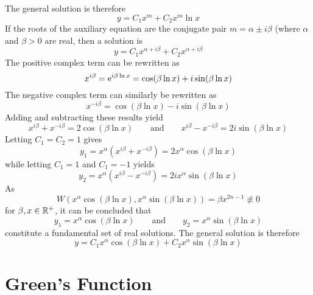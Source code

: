 \documentclass[./Differential Equations]{subfiles}
\begin{document}
				The general solution is therefore
				\[y = C_1x^m + C_2x^m\ln{x}\]
			If the roots of the auxiliary equation are the conjugate pair \(m = \alpha \pm i\beta\) (where \(\alpha\) and \(\beta > 0\) are real, then a solution is
				\[y = C_1x^{\alpha + i\beta} + C_2x^{\alpha + i\beta}\]
				The positive complex term can be rewritten as
				\[
					x^{i\beta} = \text{e}^{i\beta\ln{x}}
						= \cos(\beta\ln{x}) + i\sin(\beta\ln{x})
				\]
				The negative complex term can similarly be rewritten as
				\[x^{-i\beta} = \cos(\beta\ln{x}) - i\sin(\beta\ln{x})\]
				Adding and subtracting these results yield
				\[
					x^{i\beta} + x^{-i\beta} = 2\cos(\beta\ln{x}) \qquad \text{and} \qquad
					x^{i\beta} - x^{-i\beta} = 2i\sin(\beta\ln{x})
				\]
				Letting \(C_1 = C_2 = 1\) gives
				\[
					y_1 = x^\alpha\left(x^{i\beta} + x^{-i\beta}\right)
						= 2x^\alpha\cos(\beta\ln{x})
				\]
				while letting \(C_1 = 1\) and \(C_1 = -1\) yields 
				\[
					y_2 = x^\alpha\left(x^{i\beta} - x^{-i\beta}\right)
						= 2ix^\alpha\sin(\beta\ln{x})
				\]
				As 
				\[W\left(x^\alpha\cos(\beta\ln{x}), x^\alpha\sin(\beta\ln{x})\right) = \beta x^{2n - 1} \not\equiv 0\]
				for \(\beta, x \in \mathbb{R}^+\), it can be concluded that
				\[
					y_1 = x^\alpha\cos(\beta\ln{x}) \qquad \text{and} \qquad
					y_2 = x^\alpha\sin(\beta\ln{x})
				\]
				constitute a fundamental set of real solutions. The general solution is therefore
				\[y = C_1x^\alpha\cos(\beta\ln{x}) + C_2x^\alpha\sin(\beta\ln{x})\]
	\section{Green's Function}
\end{document}
